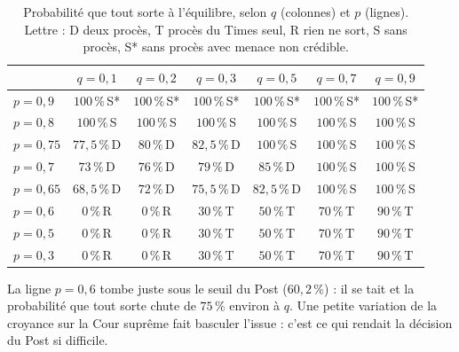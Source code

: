 \documentclass[11pt,a4paper]{article}
\theoremstyle{definition}
\begin{document}
\begin{table}[H]
\centering
\small
\caption{Probabilité que tout sorte à l'équilibre, selon $q$ (colonnes) et $p$ (lignes). Lettre : D deux procès, T procès du Times seul, R rien ne sort, S sans procès, S* sans procès avec menace non crédible.}
\begin{tabular}{@{}lcccccc@{}}
\toprule
 & $q=0,1$ & $q=0,2$ & $q=0,3$ & $q=0,5$ & $q=0,7$ & $q=0,9$ \\
\midrule
$p=0,9$ & $100\,\%$\,{\scriptsize S*} & $100\,\%$\,{\scriptsize S*} & $100\,\%$\,{\scriptsize S*} & $100\,\%$\,{\scriptsize S*} & $100\,\%$\,{\scriptsize S*} & $100\,\%$\,{\scriptsize S*} \\
$p=0,8$ & $100\,\%$\,{\scriptsize S} & $100\,\%$\,{\scriptsize S} & $100\,\%$\,{\scriptsize S} & $100\,\%$\,{\scriptsize S} & $100\,\%$\,{\scriptsize S} & $100\,\%$\,{\scriptsize S} \\
$p=0,75$ & $77,5\,\%$\,{\scriptsize D} & $80\,\%$\,{\scriptsize D} & $82,5\,\%$\,{\scriptsize D} & $100\,\%$\,{\scriptsize S} & $100\,\%$\,{\scriptsize S} & $100\,\%$\,{\scriptsize S} \\
$p=0,7$ & $73\,\%$\,{\scriptsize D} & $76\,\%$\,{\scriptsize D} & $79\,\%$\,{\scriptsize D} & $85\,\%$\,{\scriptsize D} & $100\,\%$\,{\scriptsize S} & $100\,\%$\,{\scriptsize S} \\
$p=0,65$ & $68,5\,\%$\,{\scriptsize D} & $72\,\%$\,{\scriptsize D} & $75,5\,\%$\,{\scriptsize D} & $82,5\,\%$\,{\scriptsize D} & $100\,\%$\,{\scriptsize S} & $100\,\%$\,{\scriptsize S} \\
$p=0,6$ & $0\,\%$\,{\scriptsize R} & $0\,\%$\,{\scriptsize R} & $30\,\%$\,{\scriptsize T} & $50\,\%$\,{\scriptsize T} & $70\,\%$\,{\scriptsize T} & $90\,\%$\,{\scriptsize T} \\
$p=0,5$ & $0\,\%$\,{\scriptsize R} & $0\,\%$\,{\scriptsize R} & $30\,\%$\,{\scriptsize T} & $50\,\%$\,{\scriptsize T} & $70\,\%$\,{\scriptsize T} & $90\,\%$\,{\scriptsize T} \\
$p=0,3$ & $0\,\%$\,{\scriptsize R} & $0\,\%$\,{\scriptsize R} & $30\,\%$\,{\scriptsize T} & $50\,\%$\,{\scriptsize T} & $70\,\%$\,{\scriptsize T} & $90\,\%$\,{\scriptsize T} \\
\bottomrule
\end{tabular}
\end{table}

\begin{intuition}
La ligne $p=0,6$ tombe juste sous le seuil du Post ($60,2\,\%$) : il se tait et la probabilité que tout sorte chute de $75\,\%$ environ à $q$. Une petite variation de la croyance sur la Cour suprême fait basculer l'issue : c'est ce qui rendait la décision du Post si difficile.
\end{intuition}
\end{document}

